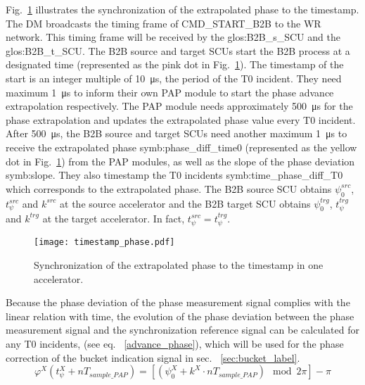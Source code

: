 Fig.~\ref{phase_diff_syn_time} illustrates the synchronization of the extrapolated phase to the timestamp. The DM broadcasts the timing frame of CMD\_START\_B2B to the WR network. This timing frame will be received by the \gls{glos:B2B_s_SCU} and the \gls{glos:B2B_t_SCU}. The B2B source and target SCUs start the B2B process at a designated time (represented as the pink dot in Fig.~\ref{phase_diff_syn_time}). The timestamp of the start is an integer multiple of \SI{10}{\us}, the period of the T0 incident. They need maximum \SI{1}{\us} to inform their own PAP module to start the phase advance extrapolation respectively. The PAP module needs approximately \SI{500}{\us} for the phase extrapolation and updates the extrapolated phase value every T0 incident. After \SI{500}{\us}, the B2B source and target SCUs need another maximum \SI{1}{\us} to receive the extrapolated phase \gls{symb:phase_diff_time0} (represented as the yellow dot in Fig.~\ref{phase_diff_syn_time}) from the PAP modules, as well as the slope of the phase deviation \gls{symb:slope}. They also timestamp the T0 incidents \gls{symb:time_phase_diff_T0} which corresponds to the extrapolated phase. The B2B source SCU obtains $\psi^\mathit{src}_0$, $t_\psi^\mathit{src}$ and $k^\mathit{src}$ at the source accelerator and the B2B target SCU obtains $\psi^\mathit{trg}_0$, $t_\psi^\mathit{trg}$ and $k^\mathit{trg}$ at the target accelerator. In fact, $t_\psi^\mathit{src}=t_\psi^\mathit{trg}$.
 \begin{figure}[H]
   \centering   
   \texttt{[image: timestamp\_phase.pdf]}
   \caption{Synchronization of the extrapolated phase to the timestamp in one accelerator.}
   \label{phase_diff_syn_time}
\end{figure}
Because the phase deviation of the phase measurement signal complies with the linear relation with time, the evolution of the phase deviation between the phase measurement signal and the synchronization reference signal can be calculated for any T0 incidents, (see eq. ~\ref{advance_phase}), which will be used for the phase correction of the bucket indication signal in sec. ~\ref{sec:bucket_label}.
\begin{equation}
\label{advance_phase}
\varphi^\mathit{X}(t_\mathit{\psi}^\mathit{X}+nT_\mathit{sample\_PAP})=[(\psi^\mathit{X}_0+k^\mathit{X}\cdot nT_\mathit{sample\_PAP}) \mod 2\pi] - \pi
\end{equation}

